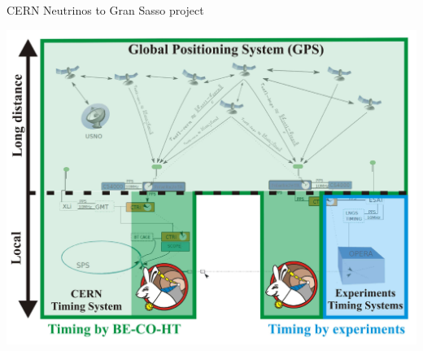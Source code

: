 \documentclass[compress,red]{beamer}
\begin{document}
\begin{frame}{CERN Neutrinos to Gran Sasso project}
   {
    \begin{center}
      \includegraphics[width=.9\textwidth]{applications/cngs-timing-31.pdf}
    \end{center}
  }
 

\end{frame}
\end{document}
